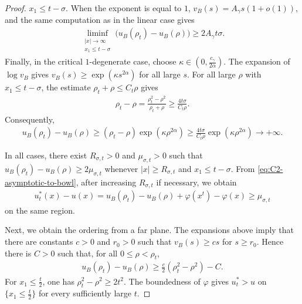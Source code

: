 \documentclass{amsart}
\theoremstyle{plain}
\theoremstyle{mainintrothm}
\theoremstyle{definition}
\begin{document}
\begin{proof}
		$x_1\le t-\sigma$.  When the exponent is equal to $1$,
		$v_B(s)=A_\gamma s(1+o(1))$, and the same computation as in the linear case
		gives
		\begin{align*}
			\liminf\limits_{\substack{|x|\to\infty\\ x_1\le t-\sigma}}
			\bigl(u_B(\rho_t)-u_B(\rho)\bigr)
			\ge
			2A_\gamma t\sigma .
		\end{align*}
		Finally, in the critical $1$-degenerate case, choose
		$\kappa\in\left(0,\frac{c_\gamma}{2\alpha}\right)$.  The expansion of
		$\log v_B$ gives $v_B(s)\ge\exp(\kappa s^{2\alpha})$ for all large $s$.
		For all large $\rho$ with $x_1\le t-\sigma$, the estimate
		$\rho_t+\rho\le C_t\rho$ gives
		\begin{align*}
			\rho_t-\rho
			=
			\frac{\rho_t^2-\rho^2}{\rho_t+\rho}
			\ge
			\frac{4t\sigma}{C_t\rho}.
		\end{align*}
		Consequently,
		\begin{align*}
			u_B(\rho_t)-u_B(\rho)
			\ge
			(\rho_t-\rho)\exp(\kappa\rho^{2\alpha})
			\ge
			\frac{4t\sigma}{C_t\rho}\exp(\kappa\rho^{2\alpha})
			\to+\infty .
		\end{align*}
		
		In all cases, there exist $R_{\sigma,t}>0$ and $\mu_{\sigma,t}>0$ such that
		$u_B(\rho_t)-u_B(\rho)\ge2\mu_{\sigma,t}$ whenever
		$|x|\ge R_{\sigma,t}$ and $x_1\le t-\sigma$.  From
		\eqref{eq:C2-asymptotic-to-bowl}, after increasing $R_{\sigma,t}$ if
		necessary, we obtain
		\begin{align*}
			u_t^*(x)-u(x)
			=
			u_B(\rho_t)-u_B(\rho)+\varphi(x^t)-\varphi(x)
			\ge
			\mu_{\sigma,t}
		\end{align*}
		on the same region.
		
		\medskip
		
		Next, we obtain the ordering from a far plane.  The expansions above imply that
		there are constants $c>0$ and $r_0>0$ such that $v_B(s)\ge cs$ for
		$s\ge r_0$.  Hence there is $C>0$ such that, for all $0\le\rho<\rho_t$,
		\begin{align*}
			u_B(\rho_t)-u_B(\rho)
			\ge
			\frac{c}{2}(\rho_t^2-\rho^2)-C .
		\end{align*}
		For $x_1\le\frac{t}{2}$, one has $\rho_t^2-\rho^2\ge2t^2$.  The boundedness
		of $\varphi$ gives $u_t^*>u$ on $\{x_1\le\frac{t}{2}\}$ for every
		sufficiently large $t$.
		
		\medskip
		

\end{proof}
\end{document}
